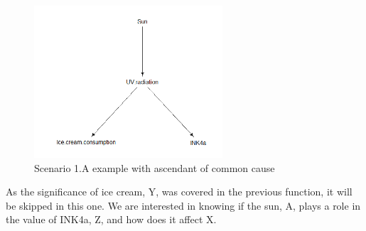 \documentclass{article}
\begin{document}
\begin{figure}[h]
\caption{Scenario 1.A example with ascendant of common cause}
\includegraphics[width=7cm]{i_uv_i_s.DAG.png}
\centering
\end{figure}

As the significance of ice cream, Y, was covered in the previous function, it will be skipped in this one. We are interested in knowing if the sun, A, plays a role in the value of INK4a, Z, and how does it affect X.\par
\end{document}
